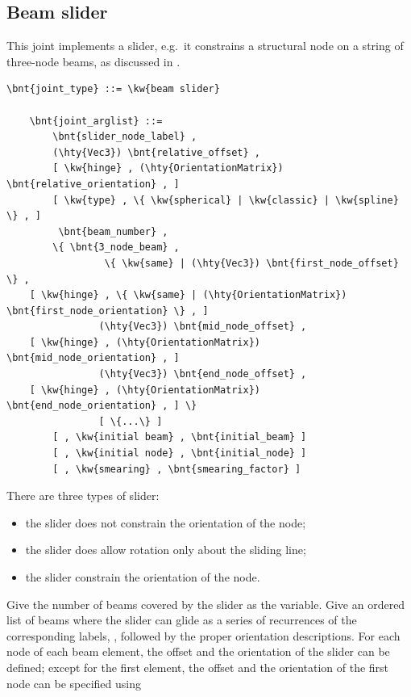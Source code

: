 \subsection{Beam slider}
This joint implements a slider, e.g.\ it constrains a structural node 
on a string of three-node beams, as discussed in \cite{SLIDER-AIDAA-2003}.
\begin{Verbatim}[commandchars=\\\{\}]
    \bnt{joint_type} ::= \kw{beam slider}

    \bnt{joint_arglist} ::=
        \bnt{slider_node_label} ,
        (\hty{Vec3}) \bnt{relative_offset} ,
        [ \kw{hinge} , (\hty{OrientationMatrix}) \bnt{relative_orientation} , ]
        [ \kw{type} , \{ \kw{spherical} | \kw{classic} | \kw{spline} \} , ]
         \bnt{beam_number} ,
	    \{ \bnt{3_node_beam} ,
                 \{ \kw{same} | (\hty{Vec3}) \bnt{first_node_offset} \} ,
    [ \kw{hinge} , \{ \kw{same} | (\hty{OrientationMatrix}) \bnt{first_node_orientation} \} , ]
                (\hty{Vec3}) \bnt{mid_node_offset} ,
    [ \kw{hinge} , (\hty{OrientationMatrix}) \bnt{mid_node_orientation} , ]
                (\hty{Vec3}) \bnt{end_node_offset} ,
    [ \kw{hinge} , (\hty{OrientationMatrix}) \bnt{end_node_orientation} , ] \}
                [ \{...\} ]
        [ , \kw{initial beam} , \bnt{initial_beam} ]
        [ , \kw{initial node} , \bnt{initial_node} ]
        [ , \kw{smearing} , \bnt{smearing_factor} ]
\end{Verbatim}
There are three types of slider:
\begin{itemize}
	\item the  slider does not constrain
	the orientation of the node;
	\item the  slider does allow rotation
	only about the sliding line;
	\item the  slider constrain the orientation
	of the node.
\end{itemize}
Give the number of beams covered by the slider as the 
variable. Give an ordered list of beams where the slider can glide
as a series of  recurrences of the corresponding labels, 
, followed by the proper orientation descriptions.
For each node of each beam element, the offset and the orientation
of the slider can be defined; except for the first element, the
offset and the orientation of the first node can be specified using
